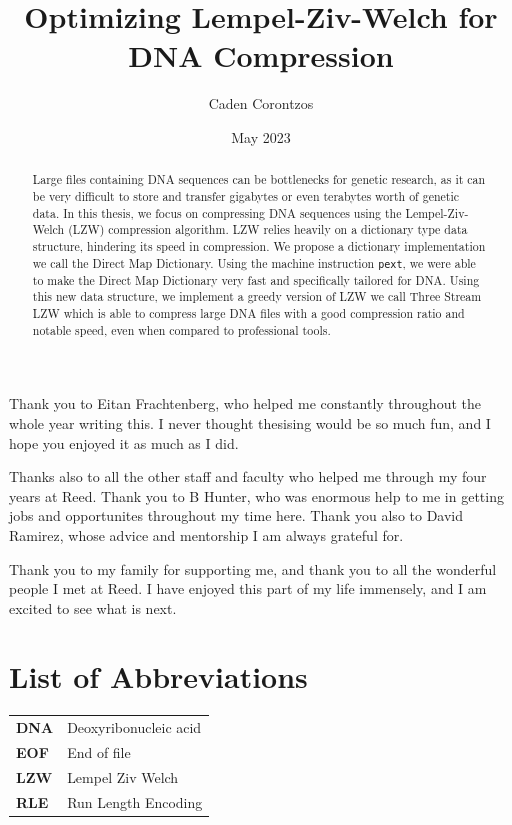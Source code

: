 \documentclass[12pt,twoside]{reedthesis}
\title{Optimizing Lempel-Ziv-Welch for DNA Compression}
\author{Caden Corontzos}
\date{May 2023}
\begin{document}
  \maketitle

\frontmatter %
\pagestyle{empty} %
  \begin{acknowledgements}
    Thank you to Eitan Frachtenberg, who helped me constantly throughout the whole year writing this. I never thought thesising would be so much fun, and I hope you enjoyed it as much as I did.

    Thanks also to all the other staff and faculty who helped me through my four years at Reed. Thank you to B Hunter, who was enormous help to me in getting jobs and opportunites throughout my time here. Thank you also to David Ramirez, whose advice and mentorship I am always grateful for.

    Thank you to my family for supporting me, and thank you to all the wonderful people I met at Reed. I have enjoyed this part of my life immensely, and I am excited to see what is next.
  \end{acknowledgements}

\chapter*{List of Abbreviations}
\begin{table}[h]
    \centering
    \begin{tabular}{ll}
                \textbf{DNA} & Deoxyribonucleic acid \\
                \textbf{EOF} & End of file \\
                \textbf{LZW} & Lempel Ziv Welch \\
                \textbf{RLE} & Run Length Encoding \\
            \end{tabular}
\end{table}
  \hypersetup{linkcolor=black}
  \setcounter{secnumdepth}{2}
  \setcounter{tocdepth}{2}
  \tableofcontents

  \listoftables

  \listoffigures
  \begin{abstract}
    Large files containing DNA sequences can be bottlenecks for genetic research, as it can be very difficult to store and transfer gigabytes or even terabytes worth of genetic data. In this thesis, we focus on compressing DNA sequences using the Lempel-Ziv-Welch (LZW) compression algorithm. LZW relies heavily on a dictionary type data structure, hindering its speed in compression. We propose a dictionary implementation we call the Direct Map Dictionary. Using the machine instruction \texttt{pext}, we were able to make the Direct Map Dictionary very fast and specifically tailored for DNA. Using this new data structure, we implement a greedy version of LZW we call Three Stream LZW which is able to compress large DNA files with a good compression ratio and notable speed, even when compared to professional tools.
  \end{abstract}
\end{document}

